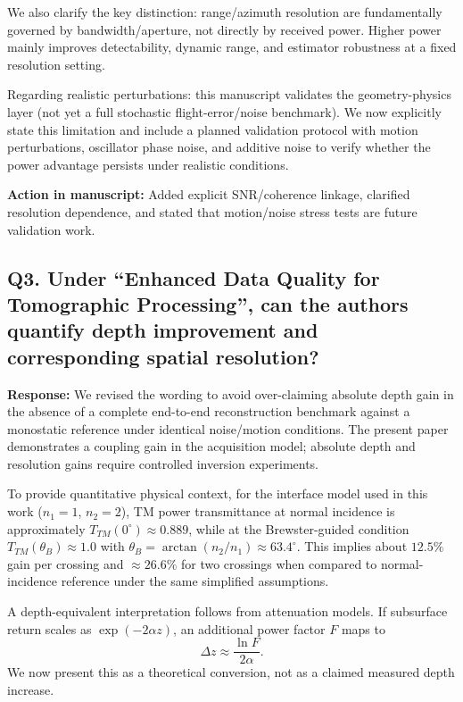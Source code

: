 \documentclass[11pt]{article}
\begin{document}
We also clarify the key distinction: range/azimuth resolution are fundamentally governed by bandwidth/aperture, not directly by received power. Higher power mainly improves detectability, dynamic range, and estimator robustness at a fixed resolution setting.

Regarding realistic perturbations: this manuscript validates the geometry-physics layer (not yet a full stochastic flight-error/noise benchmark). We now explicitly state this limitation and include a planned validation protocol with motion perturbations, oscillator phase noise, and additive noise to verify whether the power advantage persists under realistic conditions.

\textbf{Action in manuscript:} Added explicit SNR/coherence linkage, clarified resolution dependence, and stated that motion/noise stress tests are future validation work.

\subsection*{Q3. Under ``Enhanced Data Quality for Tomographic Processing'', can the authors quantify depth improvement and corresponding spatial resolution?}
\textbf{Response:} We revised the wording to avoid over-claiming absolute depth gain in the absence of a complete end-to-end reconstruction benchmark against a monostatic reference under identical noise/motion conditions. The present paper demonstrates a coupling gain in the acquisition model; absolute depth and resolution gains require controlled inversion experiments.

To provide quantitative physical context, for the interface model used in this work ($n_1=1$, $n_2=2$), TM power transmittance at normal incidence is approximately $T_{TM}(0^\circ)\approx0.889$, while at the Brewster-guided condition $T_{TM}(\theta_B)\approx1.0$ with $\theta_B=\arctan(n_2/n_1)\approx63.4^\circ$. This implies about $12.5\%$ gain per crossing and $\approx26.6\%$ for two crossings when compared to normal-incidence reference under the same simplified assumptions.

A depth-equivalent interpretation follows from attenuation models. If subsurface return scales as $\exp(-2\alpha z)$, an additional power factor $F$ maps to
\begin{equation}
\Delta z \approx \frac{\ln F}{2\alpha}.
\end{equation}
We now present this as a theoretical conversion, not as a claimed measured depth increase.
\end{document}
